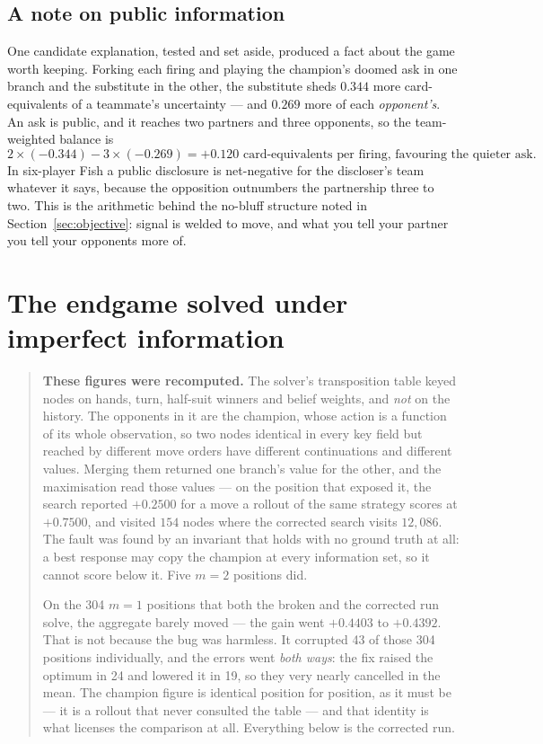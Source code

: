 \documentclass[11pt,a4paper]{article}
\begin{document}
\subsection{A note on public information}

One candidate explanation, tested and set aside, produced a fact about the game
worth keeping. Forking each firing and playing the champion's doomed ask in one
branch and the substitute in the other, the substitute sheds $0.344$ more
card-equivalents of a teammate's uncertainty --- and $0.269$ more of each
\emph{opponent's}. An ask is public, and it reaches two partners and three
opponents, so the team-weighted balance is
\[
2 \times (-0.344) - 3 \times (-0.269) = +0.120 \text{ card-equivalents per
firing, favouring the quieter ask.}
\]
In six-player Fish a public disclosure is net-negative for the discloser's team
whatever it says, because the opposition outnumbers the partnership three to
two. This is the arithmetic behind the no-bluff structure noted in
Section~\ref{sec:objective}: signal is welded to move, and what you tell your
partner you tell your opponents more of.

\section{The endgame solved under imperfect information}
\label{sec:ii}

\begin{quote}
\textbf{These figures were recomputed.} The solver's transposition table keyed
nodes on hands, turn, half-suit winners and belief weights, and \emph{not} on
the history. The opponents in it are the champion, whose action is a function
of its whole observation, so two nodes identical in every key field but reached
by different move orders have different continuations and different values.
Merging them returned one branch's value for the other, and the maximisation
read those values --- on the position that exposed it, the search reported
$+0.2500$ for a move a rollout of the same strategy scores at $+0.7500$, and
visited $154$ nodes where the corrected search visits $12{,}086$. The fault was
found by an invariant that holds with no ground truth at all: a best response
may copy the champion at every information set, so it cannot score below it.
Five $m = 2$ positions did.

On the 304 $m = 1$ positions that both the broken and the corrected run solve,
the aggregate barely moved --- the gain went $+0.4403$ to $+0.4392$. That is not
because the bug was harmless. It corrupted 43 of those 304 positions
individually, and the errors went \emph{both ways}: the fix raised the optimum
in 24 and lowered it in 19, so they very nearly cancelled in the mean. The
champion figure is identical position for position, as it must be --- it is a
rollout that never consulted the table --- and that identity is what licenses
the comparison at all. Everything below is the corrected run.
\end{quote}
\end{document}
